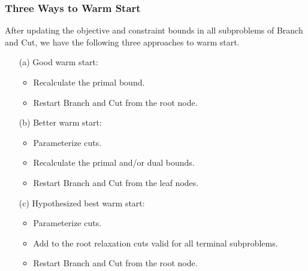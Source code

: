 \documentclass{beamer}
\begin{document}
	\begin{frame}[t]
		\frametitle{Three Ways to Warm Start}
		\small
		\vspace{-.25cm}
		\begin{block}{}
			After updating the objective and constraint bounds in all subproblems of Branch and Cut, we have the following three approaches to warm start.
		\end{block}
		\begin{itemize}
			\item [(a)] Good warm start:
			\begin{itemize}
				\item Recalculate the primal bound.
				\item Restart Branch and Cut from the root node.
			\end{itemize}
			\item [(b)] Better warm start:
			\begin{itemize}
				\item Parameterize cuts.
				\item Recalculate the primal and/or dual bounds.
				\item Restart Branch and Cut from the leaf nodes.
			\end{itemize}
			\item [(c)] Hypothesized best warm start:
			\begin{itemize}
				\item Parameterize cuts.
				\item Add to the root relaxation cuts valid for all terminal subproblems.
				\item Restart Branch and Cut from the root node.
			\end{itemize}
		\end{itemize}
		\normalsize
	\end{frame}
\end{document}
